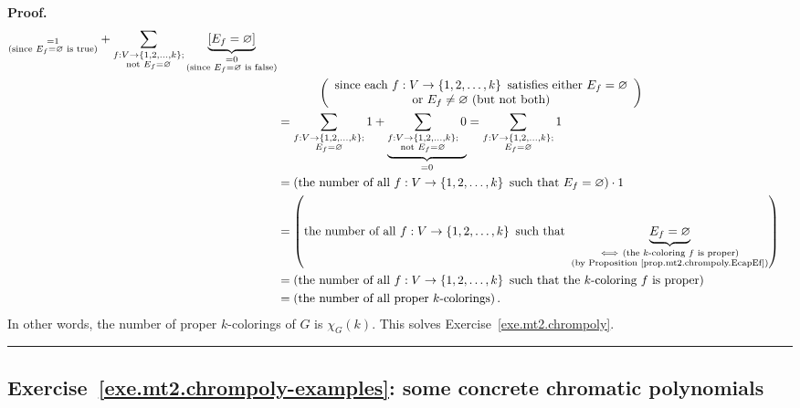 \documentclass[numbers=enddot,12pt,final,onecolumn,notitlepage]{scrartcl}%
\theoremstyle{definition}
\newenvironment{proof}[1][Proof]{\noindent\textbf{#1.} }{\ \rule{0.5em}{0.5em}}
\let\sumnonlimits\sum
\renewcommand{\sum}{\sumnonlimits\limits}
\newcommand{\set}[1]{\left\{ #1 \right\}}
\newcommand{\tup}[1]{\left( #1 \right)}
\newcommand{\underbrack}[2]{\underbrace{#1}_{\substack{#2}}}
\begin{document}
\begin{proof}
\begin{align*}
{}_{\substack{=1\\\text{(since }E_f =\varnothing\text{ is true)}}%
}+\sum_{\substack{f:V \to \set{1, 2, \ldots, k} ;\\\text{not
}E_f =\varnothing}}\underbrace{\left[  E_f =\varnothing\right]
}_{\substack{=0\\\text{(since }E_f =\varnothing\text{ is false)}}}\\
&  \ \ \ \ \ \ \ \ \ \ \left(
\begin{array}[c]{c}
\text{since each }f:V \to \set{1, 2, \ldots, k} \text{
satisfies either }E_f =\varnothing\\
\text{or }E_f \neq\varnothing\text{ (but not both)}%
\end{array}
\right)  \\
&  =\sum_{\substack{f:V\rightarrow\left\{  1,2,\ldots,k\right\}
;\\E_f =\varnothing}}1
+ \underbrack{\sum_{\substack{f:V\rightarrow\left\{  1,2,\ldots
              ,k\right\}  ;\\\text{not }E_f =\varnothing}}0}
             {= 0}
=\sum_{ \substack{f : V \to \set{1, 2, \ldots, k} ;\\
        E_f =\varnothing}}1\\
&  =\left(  \text{the number of all }f:V\rightarrow\left\{  1,2,\ldots
,k\right\}  \text{ such that }E_f =\varnothing\right)  \cdot1\\
&  =\left(  \text{the number of all }f:V\rightarrow\left\{  1,2,\ldots
,k\right\}  \text{ such that }\underbrace{E_f =\varnothing}%
_{\substack{\Longleftrightarrow\ \left(  \text{the }k\text{-coloring }f\text{
is proper}\right)  \\\text{(by Proposition \ref{prop.mt2.chrompoly.EcapEf})}%
}}\right)  \\
&  =\left(  \text{the number of all }f:V\rightarrow\left\{  1,2,\ldots
,k\right\}  \text{ such that the }k\text{-coloring }f\text{ is proper}\right)
\\
&  =\left(  \text{the number of all proper }k\text{-colorings}\right)  .
\end{align*}
In other words, the number of proper $k$-colorings of $G$ is
$\chi_G \tup{k}$.
This solves Exercise~\ref{exe.mt2.chrompoly}.
\end{proof}

\subsection{Exercise~\ref{exe.mt2.chrompoly-examples}:
some concrete chromatic polynomials}
\end{document}
